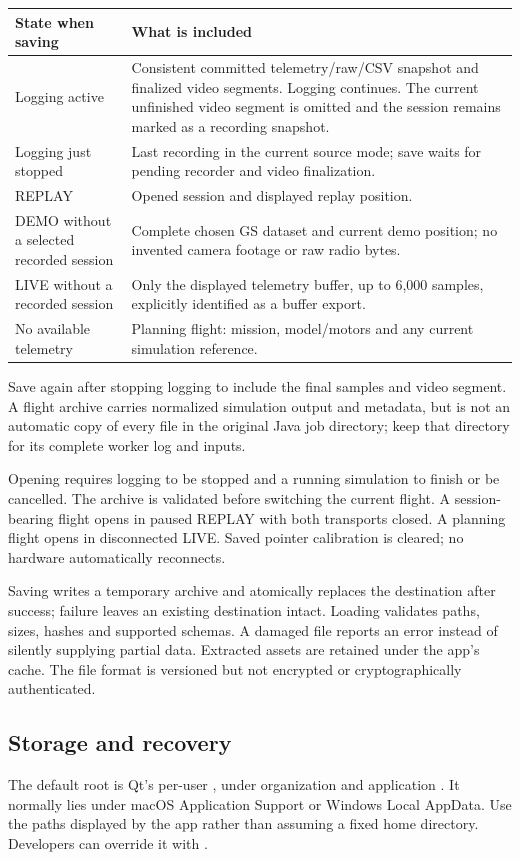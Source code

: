 \begin{longtable}{@{}L{.28\linewidth}L{.65\linewidth}@{}}
\toprule State when saving & What is included \\\midrule\endhead
Logging active & Consistent committed telemetry/raw/CSV snapshot and finalized video segments. Logging continues. The current unfinished video segment is omitted and the session remains marked as a recording snapshot. \\
Logging just stopped & Last recording in the current source mode; save waits for pending recorder and video finalization. \\
REPLAY & Opened session and displayed replay position. \\
DEMO without a selected recorded session & Complete chosen GS dataset and current demo position; no invented camera footage or raw radio bytes. \\
LIVE without a recorded session & Only the displayed telemetry buffer, up to 6,000 samples, explicitly identified as a buffer export. \\
No available telemetry & Planning flight: mission, model/motors and any current simulation reference. \\
\bottomrule
\end{longtable}
Save again after stopping logging to include the final samples and video segment.
A flight archive carries normalized simulation output and metadata, but is not an
automatic copy of every file in the original Java job directory; keep that
directory for its complete worker log and inputs.

Opening requires logging to be stopped and a running simulation to finish or
be cancelled. The archive is validated before switching the current flight.
A session-bearing flight opens in paused REPLAY with both transports closed.
A planning flight opens in disconnected LIVE. Saved pointer calibration is
cleared; no hardware automatically reconnects.

Saving writes a temporary archive and atomically replaces the destination after
success; failure leaves an existing destination intact. Loading validates paths,
sizes, hashes and supported schemas. A damaged file reports an error instead of
silently supplying partial data. Extracted assets are retained under the app's
 cache. The file format is versioned but not encrypted or
cryptographically authenticated.

\subsection{Storage and recovery}
The default root is Qt's per-user , under organization
 and application . It normally lies
under macOS Application Support or Windows Local AppData. Use the paths displayed
by the app rather than assuming a fixed home directory. Developers can override
it with .

